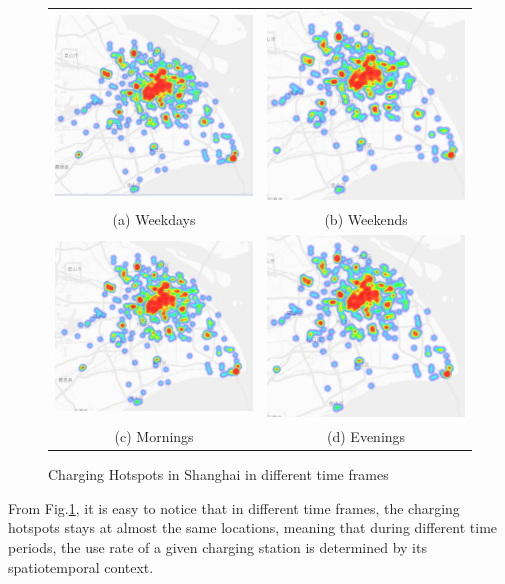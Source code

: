 \begin{figure}[!htbp]
	\begin{tabular}{cc}
		\includegraphics[width=0.45\columnwidth]{./figures/weekday.pdf} &  \includegraphics[width=0.45\columnwidth]{./figures/weekend.pdf} \\
		(a) Weekdays & (b) Weekends \\[6pt] 
		\includegraphics[width=0.45\columnwidth]{./figures/morning.pdf} &
		\includegraphics[width=0.45\columnwidth]{./figures/evening.pdf} \\
		(c) Mornings & (d) Evenings
	\end{tabular}
	\centering
	\caption{Charging Hotspots in Shanghai in different time frames}
	\label{fig3}
\end{figure}
From Fig.\ref{fig3}, it is easy to notice that in different time frames, the charging hotspots stays at almost the same locations, meaning that during different time periods, the use rate of a given charging station is determined by its spatiotemporal context.


